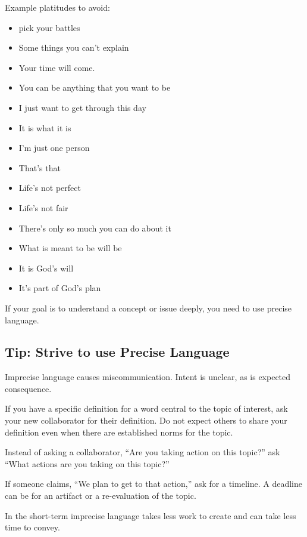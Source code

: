 Example platitudes to avoid:
\begin{itemize}
    \item pick your battles
    \item Some things you can't explain
    \item Your time will come.
    \item You can be anything that you want to be
    \item I just want to get through this day
    \item It is what it is
    \item I'm just one person
    \item That's that
    \item Life's not perfect
    \item Life's not fair
    \item There's only so much you can do about it
    \item What is meant to be will be
    \item It is God's will
    \item It's part of God's plan
\end{itemize}

If your goal is to understand a concept or issue deeply, you need to use precise language.

\subsection*{Tip: Strive to use Precise Language}

Imprecise language causes miscommunication. Intent is unclear, as is expected consequence.

If you have a specific definition for a word central to the topic of interest, ask your new collaborator for their definition. Do not expect others to share your definition even when there are established norms for the topic. 

Instead of asking a collaborator, ``Are you taking action on this topic?'' ask ``What actions are you taking on this topic?''

If someone claims, ``We plan to get to that action,'' ask for a timeline. A deadline can be for an artifact or a re-evaluation of the topic.

In the short-term imprecise language takes less work to create and can take less time to convey. 

